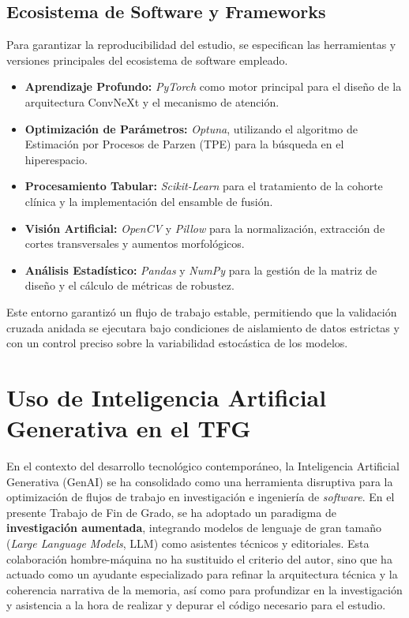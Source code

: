 \documentclass[12pt, oneside, english, spanish]{book}
\begin{document}
\subsection{Ecosistema de Software y Frameworks} \label{subsec:ecosistema_software}
Para garantizar la reproducibilidad del estudio, se especifican las herramientas y versiones principales del ecosistema de software empleado.
\begin{itemize}
	\item \textbf{Aprendizaje Profundo:} \textit{PyTorch} como motor principal para el diseño de la arquitectura ConvNeXt y el mecanismo de atención.
	\item \textbf{Optimización de Parámetros:} \textit{Optuna}, utilizando el algoritmo de Estimación por Procesos de Parzen (TPE) para la búsqueda en el hiperespacio.
	\item \textbf{Procesamiento Tabular:} \textit{Scikit-Learn} para el tratamiento de la cohorte clínica y la implementación del ensamble de fusión.
	\item \textbf{Visión Artificial:} \textit{OpenCV} y \textit{Pillow} para la normalización, extracción de cortes transversales y aumentos morfológicos.
	\item \textbf{Análisis Estadístico:} \textit{Pandas} y \textit{NumPy} para la gestión de la matriz de diseño y el cálculo de métricas de robustez.
\end{itemize}

Este entorno garantizó un flujo de trabajo estable, permitiendo que la validación cruzada anidada se ejecutara bajo condiciones de aislamiento de datos estrictas y con un control preciso sobre la variabilidad estocástica de los modelos.



\section{Uso de Inteligencia Artificial Generativa en el TFG} \label{sec:metodologia_ia}

En el contexto del desarrollo tecnológico contemporáneo, la Inteligencia Artificial Generativa (GenAI) se ha consolidado como una herramienta disruptiva para la optimización de flujos de trabajo en investigación e ingeniería de \textit{software}. En el presente Trabajo de Fin de Grado, se ha adoptado un paradigma de \textbf{investigación aumentada}, integrando modelos de lenguaje de gran tamaño (\textit{Large Language Models}, LLM) como asistentes técnicos y editoriales. Esta colaboración hombre-máquina no ha sustituido el criterio del autor, sino que ha actuado como un ayudante especializado para refinar la arquitectura técnica y la coherencia narrativa de la memoria, así como para profundizar en la investigación y asistencia a la hora de realizar y depurar el código necesario para el estudio.
\end{document}

